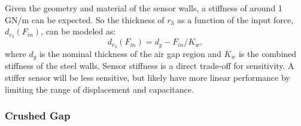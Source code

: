 Given the geometry and material of the sensor walls, 
a stiffness of around 1 GN/m can be expected.
So the thickness of $r_3$ as a function of the input force, 
$d_{r_3}(F_{in})$, can be modeled as:
\begin{equation}
d_{r_3}(F_{in}) = d_g - F_{in} / K_w,
\end{equation}
where $d_g$ is the nominal thickness of the air gap region 
and $K_w$ is the combined stiffness of the steel walls.
Sensor stiffness is a direct trade-off for sensitivity. 
A stiffer sensor will be less sensitive, but likely have more linear performance
by limiting the range of displacement and capacitance.



\subsubsection{Crushed Gap}


